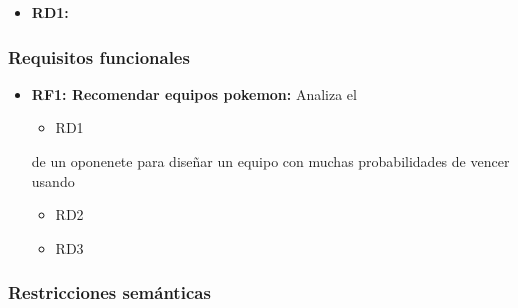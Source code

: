 
	\begin{itemize}
		\item \textbf{RD1: }
	\end{itemize}


\subsubsection{Requisitos funcionales}

	\begin{itemize}
		\item \textbf{RF1: Recomendar equipos pokemon:}
		Analiza el 
		\begin{itemize}
			\item RD1 %
		\end{itemize}
		de un oponenete para diseñar un equipo con muchas
		probabilidades de vencer usando
		\begin{itemize}
			\item RD2
			\item RD3
		\end{itemize}
	\end{itemize}


\subsubsection{Restricciones semánticas}

